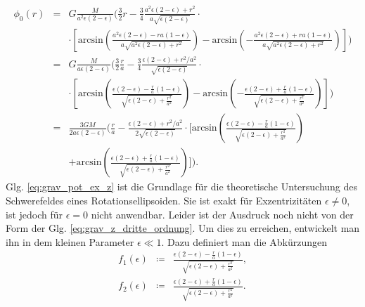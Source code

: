 \documentclass{book}
\renewcommand{\arcsin}{\text{arcsin}}
\begin{document}
\begin{eqnarray}
\phi_0\left(r\right) & = & G\frac{M}{a^2\epsilon\left(2 - \epsilon\right)}\bigg(\frac{3}{2}r - \frac{3}{4}\frac{a^2\epsilon\left(2 - \epsilon\right) + r^2}{a\sqrt{\epsilon\left(2 - \epsilon\right)}}\cdot\nonumber\\
&&\cdot\left[\arcsin\left(\frac{a^2\epsilon\left(2 - \epsilon\right) - ra\left(1 - \epsilon\right)}{a\sqrt{a^2\epsilon\left(2 - \epsilon\right) + r^2}}\right) - \arcsin\left(-\frac{a^2\epsilon\left(2 - \epsilon\right) + ra\left(1 - \epsilon\right)}{a\sqrt{a^2\epsilon\left(2 - \epsilon\right) + r^2}}\right)\right]\bigg)\nonumber\\
& = & G\frac{M}{a\epsilon\left(2 - \epsilon\right)}\bigg(\frac{3}{2}\frac{r}{a} - \frac{3}{4}\frac{\epsilon\left(2 - \epsilon\right) + r^2/a^2}{\sqrt{\epsilon\left(2 - \epsilon\right)}}\cdot\nonumber\\
&&\cdot\left[\arcsin\left(\frac{\epsilon\left(2 - \epsilon\right) - \frac{r}{a}\left(1 - \epsilon\right)}{\sqrt{\epsilon\left(2 - \epsilon\right) + \frac{r^2}{a^2}}}\right) - \arcsin\left(-\frac{\epsilon\left(2 - \epsilon\right) + \frac{r}{a}\left(1 - \epsilon\right)}{\sqrt{\epsilon\left(2 - \epsilon\right) + \frac{r^2}{a^2}}}\right)\right]\bigg)\nonumber\\
& = & \frac{3GM}{2a\epsilon\left(2 - \epsilon\right)}\bigg(\frac{r}{a} - \frac{\epsilon\left(2 - \epsilon\right) + r^2/a^2}{2\sqrt{\epsilon\left(2 - \epsilon\right)}}\cdot\bigg[\arcsin\left(\frac{\epsilon\left(2 - \epsilon\right) - \frac{r}{a}\left(1 - \epsilon\right)}{\sqrt{\epsilon\left(2 - \epsilon\right) + \frac{r^2}{a^2}}}\right)\nonumber\\
&&+ \arcsin\left(\frac{\epsilon\left(2 - \epsilon\right) + \frac{r}{a}\left(1 - \epsilon\right)}{\sqrt{\epsilon\left(2 - \epsilon\right) + \frac{r^2}{a^2}}}\right)\bigg]\bigg).\label{eq:grav_pot_ex_z}
\end{eqnarray}
%
Glg. \eqref{eq:grav_pot_ex_z} ist die Grundlage für die theoretische Untersuchung des Schwerefeldes eines Rotationsellipsoiden. Sie ist exakt für Exzentrizitäten $\epsilon\not = 0$, ist jedoch für $\epsilon = 0$ nicht anwendbar. Leider ist der Ausdruck noch nicht von der Form der Glg. \eqref{eq:grav_z_dritte_ordnung}. Um dies zu erreichen, entwickelt man ihn in dem kleinen Parameter $\epsilon\ll 1$. Dazu definiert man die Abkürzungen
%
\begin{eqnarray}
f_1\left(\epsilon\right)& \coloneqq&\frac{\epsilon\left(2 - \epsilon\right) - \frac{r}{a}\left(1 - \epsilon\right)}{\sqrt{\epsilon\left(2 - \epsilon\right) + \frac{r^2}{a^2}}},\\
f_2\left(\epsilon\right)& \coloneqq&\frac{\epsilon\left(2 - \epsilon\right) + \frac{r}{a}\left(1 - \epsilon\right)}{\sqrt{\epsilon\left(2 - \epsilon\right) + \frac{r^2}{a^2}}}.
\end{eqnarray}
\end{document}
